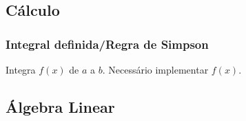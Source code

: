 \subsection{Cálculo}

\subsubsection{Integral definida/Regra de Simpson}
Integra $f(x)$ de $a$ a $b$. Necessário implementar $f(x)$.

\divisor



\subsection{Álgebra Linear}

